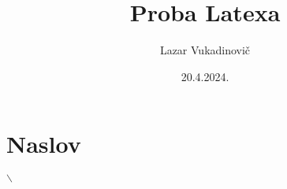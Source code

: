 \documentclass[a4]{article}
\title{Proba Latexa}
\author{Lazar Vukadinovi\v c}
\date{20.4.2024.}
\begin{document}
    \maketitle
    \thispagestyle{empty}
    \newpage
    \section{Naslov}
    \tableofcontents
    
    $\backslash$
    
    
\end{document}
